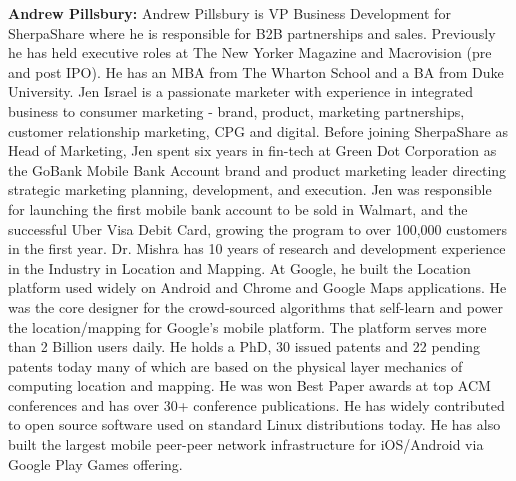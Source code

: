 \newline
\noindent
{\bf Andrew Pillsbury:}
Andrew Pillsbury is VP Business Development for SherpaShare where he is responsible for B2B partnerships and sales. Previously he has held executive roles at The New Yorker Magazine and Macrovision (pre and post IPO). He has an MBA from The Wharton School and a BA from Duke University.
\newline
\newline
{}
Jen Israel is a passionate marketer with experience in integrated business to consumer marketing - brand, product,
marketing partnerships, customer relationship marketing, CPG and digital. Before joining SherpaShare as Head of
Marketing, Jen spent six years in fin-tech at Green Dot Corporation as the GoBank Mobile Bank Account brand and product
marketing leader directing strategic marketing planning, development, and execution.  Jen was responsible for launching
the first mobile bank account to be sold in Walmart, and the successful Uber Visa Debit Card, growing the program to
over 100,000 customers in the first year.
\newline
\newline
{} Dr. Mishra has 10 years of research and development experience in the Industry in
Location and Mapping. At Google, he built the Location platform used widely on Android and Chrome and Google Maps
applications. He was the core designer for the crowd-sourced algorithms that self-learn and power the location/mapping
for Google's mobile platform. The platform serves more than 2 Billion users daily. He holds a PhD, 30 issued patents and
22 pending patents today many of which are based on the physical layer mechanics of computing location and mapping. He
was won Best Paper awards at top ACM conferences and has over 30+ conference publications. He has widely contributed to
open source software used on standard Linux distributions today. He has also built the largest mobile peer-peer network
infrastructure for iOS/Android via Google Play Games offering.
